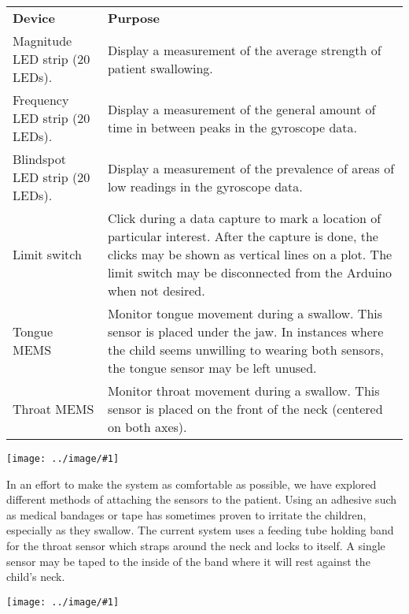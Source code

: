 \documentclass{article}
\newcommand{\img}[2]{
    \begin{center}
        \texttt{[image: ../image/\#1]}
    \end{center}    
}
\begin{document}
                \noindent\begin{tabular}{lp{8cm}}
                \textbf{Device} & \textbf{Purpose} \\
                Magnitude LED strip (20 LEDs). & Display a measurement of the average strength of patient swallowing. \\
                Frequency LED strip (20 LEDs). & Display a measurement of the general amount of time in between peaks in the gyroscope data. \\
                Blindspot LED strip (20 LEDs). & Display a measurement of the prevalence of areas of low readings in the gyroscope data. \\
                Limit switch & Click during a data capture to mark a location of particular interest. After the capture is done, the clicks may be shown as vertical lines on a plot. The limit switch may be disconnected from the Arduino when not desired. \\
                Tongue MEMS & Monitor tongue movement during a swallow. This sensor is placed under the jaw. In instances where the child seems unwilling to wearing both sensors, the tongue sensor may be left unused.\\
                Throat MEMS & Monitor throat movement during a swallow. This sensor is placed on the front of the neck (centered on both axes).
                \end{tabular}
            
            \vspace{3pt}
            \img{strips}{0.0875}
            
        In an effort to make the system as comfortable as possible, we have explored different methods of attaching the sensors to the patient. Using an adhesive such as medical bandages or tape has sometimes proven to irritate the children, especially as they swallow. The current system uses a feeding tube holding band for the throat sensor which straps around the neck and locks to itself. A single sensor may be taped to the inside of the band where it will rest against the child's neck.
        
        \vspace{3pt}
        \img{band}{0.0881}
        
\end{document}
